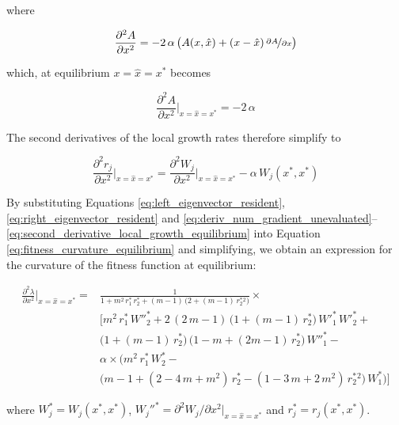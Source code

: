 where

\begin{equation}
    \frac{\partial^2 A}{\partial x^2} = -2\,\alpha\,\big( A(x,\hat{x}) + (x-\hat{x})\,\nicefrac{\partial A}{\partial x} \big)
\end{equation}

which, at equilibrium $x=\hat{x}=x^*$ becomes

\begin{equation}
    \frac{\partial^2 A}{\partial x^2}\bigg|_{x=\hat{x}=x^*} = -2\,\alpha
\end{equation}

The second derivatives of the local growth rates therefore simplify to

\begin{equation}
    \frac{\partial^2 r_j}{\partial x^2}\bigg|_{x=\hat{x}=x^*}= \frac{\partial^2 W_j}{\partial x^2}\bigg|_{x=\hat{x}=x^*} - \alpha \, W_j(x^*,x^*)
    \label{eq:second_derivative_local_growth_equilibrium}
\end{equation}

By substituting Equations \ref{eq:left_eigenvector_resident}, \ref{eq:right_eigenvector_resident} and \ref{eq:deriv_num_gradient_unevaluated}--\ref{eq:second_derivative_local_growth_equilibrium} into Equation \ref{eq:fitness_curvature_equilibrium} and simplifying, we obtain an expression for the curvature of the fitness function at equilibrium:

\begin{equation}
    \begin{split}
        \frac{\partial^2 \lambda}{\partial x^2}\bigg|_{x=\hat x=x^*}=&\frac{1}{1 + m^2\,r^*_1\,r^*_2 + (m - 1)\,\big(2 + (m - 1)\,r^*_2^2\big)} \times \\
        &\Bigg[m^2\, r^*_ 1\, W''^*_2 + 2\, (2\, m - 1)\, \big(1 + (m - 1)\, r^*_ 2\big)\, W'^*_1 \, W'^*_2 +\\
        &\big(1 + (m - 1) \, r^*_ 2\big)\, \big(1 - m + (2 m - 1) \,r^*_ 2\big)\, W''^*_1 -\\
        &\alpha \times \Big(m^2\, r^*_ 1\, W^*_2 - \\
        & \big(m - 1 + (2 - 4\,m + m^2)\, r^*_ 2 - (1 - 3\,m + 2\,m^2)\,r^*_ 2^2\big)\,W^*_1 \Big)\Bigg]
    \end{split}
    \label{eq:fitness_curvature_equilibrium_expression}
\end{equation}

where $W_j^* = W_j(x^*, x^*)$, $W_j''^* = \partial^2 W_j / \partial x^2 |_{x=\hat{x}=x^*}$ and $r_j^* = r_j(x^*, x^*)$.\\

